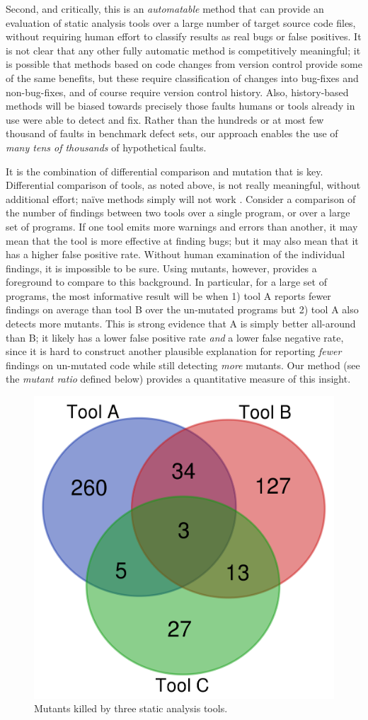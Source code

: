 Second, and critically, this is an \emph{automatable} method that can provide an evaluation of static analysis tools over a large number of target source code files, without requiring human effort to classify results as real bugs or false positives.  It is not clear that any other fully automatic method is competitively meaningful; it is possible that methods based on code changes from version control provide some of the same benefits, but these require classification of changes into bug-fixes and non-bug-fixes, and of course require version control history.  Also, history-based methods will be biased towards precisely those faults humans or tools already in use were able to detect and fix.  Rather than the hundreds \cite{just2014defects4j} or at most few thousand of faults \cite{BugSwarm} in benchmark defect sets, our approach enables the use of \emph{many tens of thousands} of hypothetical faults.

It is the combination of differential comparison and mutation that is key.  Differential comparison of tools, as noted above, is not really meaningful, without additional effort; na\"ive methods simply will not work \cite{regehrRandom}.  Consider a comparison of the number of findings between two tools over a single program, or over a large set of programs.  If one tool emits more warnings and errors than another, it may mean that the tool is more effective at finding bugs; but it may also mean that it has a higher false positive rate.  Without human examination of the individual findings, it is impossible to be sure.  Using mutants, however, provides a foreground to compare to this background.  In particular, for a large set of programs, the most informative result will be when 1) tool A reports fewer findings on average than tool B over the un-mutated programs but 2) tool A also detects more mutants.  This is strong evidence that A is simply better all-around than B; it likely has a lower false positive rate \emph{and} a lower false negative rate, since it is hard to construct another plausible explanation for reporting \emph{fewer} findings on un-mutated code while still detecting \emph{more} mutants.  Our method (see the \emph{mutant ratio} defined below) provides a quantitative measure of this insight.

\begin{figure}
  \centering
  \includegraphics[width=0.35\columnwidth]{example.png}
  \caption{Mutants killed by three static analysis tools.}
  \label{fig:examplevenn}
\end{figure}


